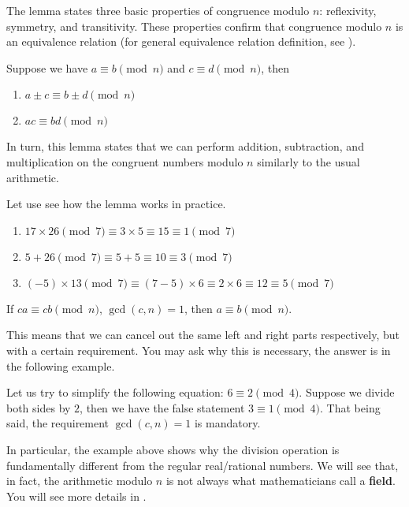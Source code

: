 \documentclass[../lecture-notes-148x210.tex]{subfiles}
\begin{document}
The lemma states three basic properties of congruence modulo $n$: reflexivity, symmetry, and transitivity. 
These properties confirm that congruence modulo $n$ is an equivalence relation (for general equivalence relation definition, see ).

\begin{lemma}
    Suppose we have $a \equiv b \pmod{n}$ and $c \equiv d \pmod{n}$, then 
        \begin{enumerate}
            \item $a \pm c \equiv b \pm d \pmod{n}$
            \item $ac \equiv bd \pmod{n}$
        \end{enumerate}
\end{lemma}

In turn, this lemma states that we can perform addition, subtraction, and multiplication on the congruent numbers modulo $n$ similarly to the usual arithmetic.

\begin{example}
    Let use see how the lemma works in practice.
    \begin{enumerate}
        \item $17 \times 26 \pmod{7} \equiv 3 \times 5 \equiv 15 \equiv 1 \pmod{7}$
        \item $5 + 26 \pmod{7} \equiv 5 + 5 \equiv 10 \equiv 3 \pmod{7}$
        \item $(-5) \times 13 \pmod{7} \equiv (7-5) \times 6 \equiv 2 \times 6 \equiv 12 \equiv 5 \pmod{7}$
    \end{enumerate}
\end{example}

\begin{lemma}
    If $ca \equiv cb \pmod{n}$, $\gcd(c, n) = 1$, then $ a \equiv b \pmod{n}$.
\end{lemma}

This means that we can cancel out the same left and right parts respectively, but with a 
certain requirement. You may ask why this is necessary, the answer is in the following example.

\begin{example}
    Let us try to simplify the following equation: $6 \equiv 2 \pmod{4}$. Suppose we 
    divide both sides by $2$, then we have the false statement $3 \equiv 1 \pmod{4}$. 
    That being said, the requirement $\gcd(c, n) = 1$ is mandatory. 
\end{example}

\begin{remark}
    In particular, the example above shows why the division operation is fundamentally 
    different from the regular real/rational numbers. We will see that, in fact, the 
    arithmetic modulo $n$ is not always what mathematicians call a \textbf{field}. 
    You will see more details in .
\end{remark}
\end{document}
